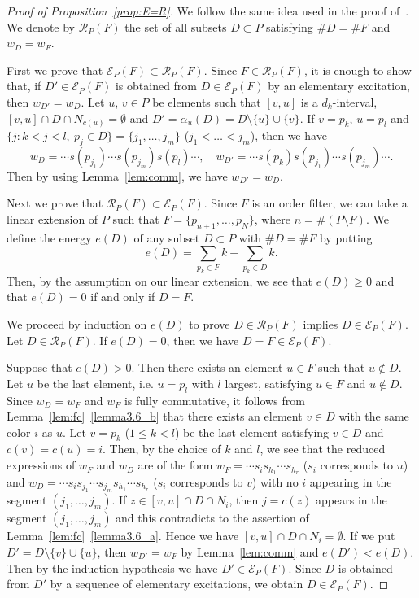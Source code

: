 \documentclass[10pt]{amsart}
\theoremstyle{definition}
\theoremstyle{remark}
\newcommand\EE{\mathcal{E}}
\newcommand\RR{\mathcal{R}}
\begin{document}
\begin{proof}[Proof of Proposition~\ref{prop:E=R}]
We follow the same idea used in the proof of~\cite[Proposition~4.8]{GK}.
We denote by $\RR_P(F)$ the set of all subsets $D \subset P$ satisfying $\# D = \# F$ and $w_D = w_F$.

First we prove that $\EE_P(F) \subset \RR_P(F)$.
Since $F \in \RR_P(F)$, it is enough to show that, 
if $D' \in \EE_P(F)$ is obtained from $D \in \EE_P(F)$ by an elementary excitation, 
then $w_{D'} = w_D$.
Let $u$, $v \in P$ be elements such that $[v,u]$ is a $d_k$-interval, 
$[v,u] \cap D \cap N_{c(u)} = \emptyset$ and 
$D' = \alpha_u(D) = D \setminus \{ u \} \cup \{ v \}$.
If $v = p_k$, $u = p_l$ and $\{ j : k < j < l, \ p_j \in D \} = \{ j_1, \dots, j_m \}$ 
($j_1 < \dots < j_m$), then we have
$$
w_D = \cdots s(p_{j_1}) \cdots s(p_{j_m}) s(p_l) \cdots,
\quad
w_{D'} = \cdots s(p_k) s(p_{j_1}) \cdots s(p_{j_m}) \cdots.
$$
Then by using Lemma~\ref{lem:comm}, we have $w_{D'} = w_D$.

Next we prove that $\RR_P(F) \subset \EE_P(F)$.
Since $F$ is an order filter, we can take a linear extension of $P$ 
such that $F = \{ p_{n+1}, \ldots, p_N \}$, where $n = \# (P \setminus F)$.
We define the energy $e(D)$ of any subset $D \subset P$ with $\# D = \# F$ by putting
$$
e(D) = \sum_{p_k \in F} k - \sum_{p_k \in D} k.
$$
Then, by the assumption on our linear extension, 
we see that $e(D) \ge 0$ and that $e(D) = 0$ if and only if $D = F$.

We proceed by induction on $e(D)$ to prove $D \in \RR_P(F)$ implies $D \in \EE_P(F)$.
Let $D \in \RR_P(F)$.
If $e(D) = 0$, then we have $D = F \in \EE_P(F)$.

Suppose that $e(D) > 0$.
Then there exists an element $u \in F$ such that $u \not\in D$.
Let $u$ be the last element, i.e. $u = p_l$ with $l$ largest, 
satisfying $u \in F$ and $u \not\in D$.
Since $w_D = w_F$ and $w_F$ is fully commutative, it follows from Lemma~\ref{lem:fc}~\ref{lemma3.6_b} %
that there exists an element $v \in D$ with the same color $i$ as $u$.
Let $v = p_k$ ($1 \le k < l$) be the last element satisfying $v \in D$ and $c(v) = c(u) = i$.
Then, by the choice of $k$ and $l$, we see that the reduced expressions of $w_F$ and $w_D$
are of the form $w_F = \cdots s_i s_{h_1} \cdots s_{h_r}$ ($s_i$ corresponds to $u$) 
and $w_D = \cdots s_i s_{j_1} \cdots s_{j_m} s_{h_1} \cdots s_{h_r}$ ($s_i$ corresponds to $v$) 
with no $i$ appearing in the segment $(j_1, \dots, j_m)$.
If $z \in [v,u] \cap D \cap N_i$, then $j = c(z)$ appears in the segment $(j_1, \dots, j_m)$ 
and this contradicts to the assertion of Lemma~\ref{lem:fc}~\ref{lemma3.6_a}.
Hence we have $[v,u] \cap D \cap N_i = \emptyset$.
If we put $D' = D \setminus \{ v \} \cup \{ u \}$,
then $w_{D'} = w_F$ by Lemma~\ref{lem:comm} and $e(D') < e(D)$.
Then by the induction hypothesis we have $D' \in \EE_P(F)$.
Since $D$ is obtained from $D'$ by a sequence of elementary excitations, 
we obtain $D \in \EE_P(F)$.
\end{proof}
\end{document}
